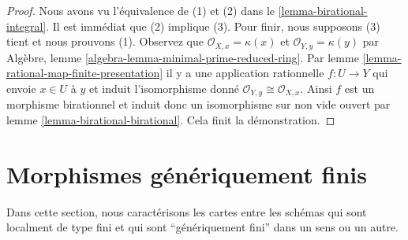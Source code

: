 \begin{proof}

Nous avons vu l'équivalence de (1) et (2) dans le \ref{lemma-birational-integral}. Il est immédiat que (2) implique (3). Pour finir, nous supposons (3) tient et nous prouvons (1). Observez que $\mathcal{O}_{X, x} = \kappa(x)$ et
$\mathcal{O}_{Y, y} = \kappa(y)$ par Algèbre, lemme \ref{algebra-lemma-minimal-prime-reduced-ring}. Par lemme \ref{lemma-rational-map-finite-presentation}
il y a une application rationnelle $f : U \to Y$
qui envoie $x \in U$ à $y$ et induit l'isomorphisme donné $\mathcal{O}_{Y, y} \cong \mathcal{O}_{X, x}$. Ainsi $f$ est un morphisme birationnel et induit donc un isomorphisme sur non vide ouvert par lemme \ref{lemma-birational-birational}. Cela finit la démonstration.

\end{proof}







\section{Morphismes génériquement finis}
\label{section-generically-finite}

\noindent
Dans cette section, nous caractérisons les cartes entre les schémas qui sont localment de type fini et qui sont ``génériquement fini'' dans un sens ou un autre.

